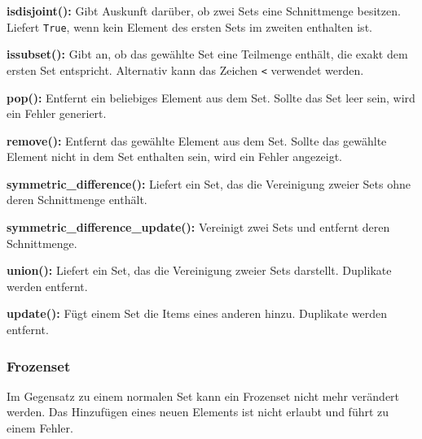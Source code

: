 \textbf{isdisjoint():}
Gibt Auskunft darüber, ob zwei Sets eine Schnittmenge besitzen. Liefert \lstinline$True$, wenn kein Element des ersten Sets im zweiten enthalten ist.

\label{collections:lst:setisdisjoint} 
    
\textbf{issubset():}
Gibt an, ob das gewählte Set eine Teilmenge enthält, die exakt dem ersten Set entspricht. Alternativ kann das Zeichen \lstinline$<$ verwendet werden.

\label{collections:lst:setissubset} 
    
\textbf{pop():}
Entfernt ein beliebiges Element aus dem Set. Sollte das Set leer sein, wird ein Fehler generiert.

\label{collections:lst:setpop} 
    
\textbf{remove():}
Entfernt das gewählte Element aus dem Set. Sollte das gewählte Element nicht in dem Set enthalten sein, wird ein Fehler angezeigt.

\label{collections:lst:setremove} 
    
\textbf{symmetric\_difference():}
Liefert ein Set, das die Vereinigung zweier Sets ohne deren Schnittmenge enthält.

\label{collections:lst:setsymdiff} 
    
\textbf{symmetric\_difference\_update():}
Vereinigt zwei Sets und entfernt deren Schnittmenge.%

\label{collections:lst:setsymdiffupdate} 
    
\textbf{union():}
Liefert ein Set, das die Vereinigung zweier Sets darstellt. Duplikate werden entfernt.

\label{collections:lst:setunion} 
    
\textbf{update():}
Fügt einem Set die Items eines anderen hinzu. Duplikate werden entfernt.

\label{collections:lst:setupdate} 
    
\subsubsection{Frozenset}

Im Gegensatz zu einem \glqq{}normalen\grqq{} Set kann ein Frozenset nicht mehr verändert werden. Das Hinzufügen eines neuen Elements ist nicht erlaubt und führt zu einem Fehler.

\label{collections:lst:setfrozen} 

